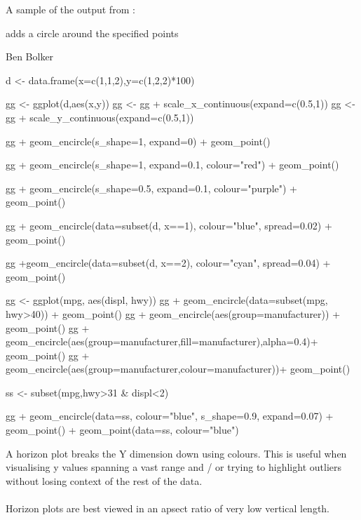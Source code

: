 \documentclass[a4paper]{book}
\begin{document}
%
\begin{Details}



A sample of the output from :


\end{Details}
%
\begin{Value}
adds a circle around the specified points
\end{Value}
%
\begin{Author}
Ben Bolker
\end{Author}
%
\begin{Examples}
\begin{ExampleCode}
d <- data.frame(x=c(1,1,2),y=c(1,2,2)*100)

gg <- ggplot(d,aes(x,y))
gg <- gg + scale_x_continuous(expand=c(0.5,1))
gg <- gg + scale_y_continuous(expand=c(0.5,1))

gg + geom_encircle(s_shape=1, expand=0) + geom_point()

gg + geom_encircle(s_shape=1, expand=0.1, colour="red") + geom_point()

gg + geom_encircle(s_shape=0.5, expand=0.1, colour="purple") + geom_point()

gg + geom_encircle(data=subset(d, x==1), colour="blue", spread=0.02) +
  geom_point()

gg +geom_encircle(data=subset(d, x==2), colour="cyan", spread=0.04) +
  geom_point()

gg <- ggplot(mpg, aes(displ, hwy))
gg + geom_encircle(data=subset(mpg, hwy>40)) + geom_point()
gg + geom_encircle(aes(group=manufacturer)) + geom_point()
gg + geom_encircle(aes(group=manufacturer,fill=manufacturer),alpha=0.4)+
       geom_point()
gg + geom_encircle(aes(group=manufacturer,colour=manufacturer))+
       geom_point()

ss <- subset(mpg,hwy>31 & displ<2)

gg + geom_encircle(data=ss, colour="blue", s_shape=0.9, expand=0.07) +
  geom_point() + geom_point(data=ss, colour="blue")
\end{ExampleCode}
\end{Examples}
%
\begin{Description}
A horizon plot breaks the Y dimension down using colours. This is useful
when visualising y values spanning a vast range and / or trying to highlight
outliers without losing context of the rest of the data.\\{} \\{} Horizon
plots are best viewed in an apsect ratio of very low vertical length.
\end{Description}
\end{document}
